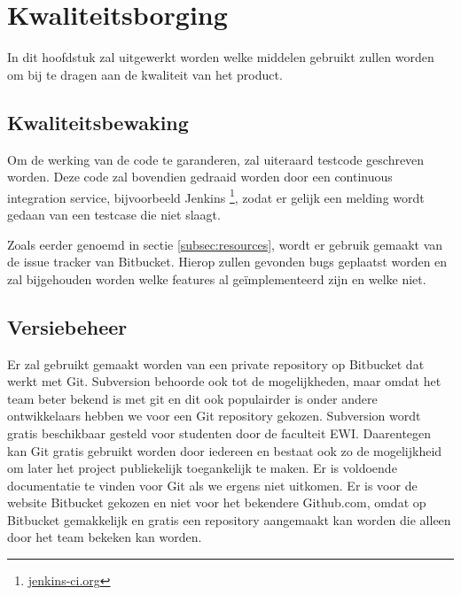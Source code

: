 \section{Kwaliteitsborging}
In dit hoofdstuk zal uitgewerkt worden welke middelen gebruikt zullen worden om bij te dragen aan de kwaliteit van het product.

\subsection{Kwaliteitsbewaking}
Om de werking van de code te garanderen, zal uiteraard testcode geschreven worden. Deze code zal bovendien gedraaid worden door een continuous integration service, bijvoorbeeld Jenkins \footnote{\url{jenkins-ci.org}}, zodat er gelijk een melding wordt gedaan van een testcase die niet slaagt.

Zoals eerder genoemd in sectie \ref{subsec:resources}, wordt er gebruik gemaakt van de issue tracker van Bitbucket. Hierop zullen gevonden bugs geplaatst worden en zal bijgehouden worden welke features al ge\"implementeerd zijn en welke niet.

\subsection{Versiebeheer}
Er zal gebruikt gemaakt worden van een private repository op Bitbucket dat werkt met Git. Subversion behoorde ook tot de mogelijkheden, maar omdat het team beter bekend is met git en dit ook populairder is onder andere ontwikkelaars hebben we voor een Git repository gekozen. Subversion wordt gratis beschikbaar gesteld voor studenten door de faculteit EWI. Daarentegen kan Git gratis gebruikt worden door iedereen en bestaat ook zo de mogelijkheid om later het project publiekelijk toegankelijk te maken. Er is voldoende documentatie te vinden voor Git als we ergens niet uitkomen. Er is voor de website Bitbucket gekozen en niet voor het bekendere Github.com, omdat op Bitbucket gemakkelijk en gratis een repository aangemaakt kan worden die alleen door het team bekeken kan worden. 
